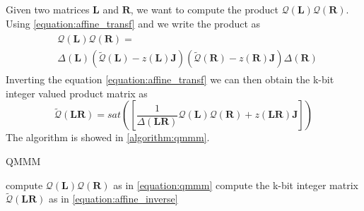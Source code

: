  Given two matrices $\mathbf{L}$ and $\mathbf{R}$, we want to compute the product $\mathcal{Q}(\mathbf{L}) \mathcal{Q}(\mathbf{R})$. Using \cref{equation:affine_transf} and we write the product as 
\begin{align}\label{equation:qmmm}
\begin{split}
& \mathcal{Q}(\mathbf{L}) \mathcal{Q}(\mathbf{R}) =\\
 & \Delta (\mathbf{L})\left( \tilde{\mathcal{Q}}(\mathbf{L}) - z(\mathbf{L})\mathbf{J} \right)
\left( \tilde{\mathcal{Q}}(\mathbf{R}) - z(\mathbf{R})\mathbf{J} \right)  \Delta (\mathbf{R})
\end{split}
\end{align}
Inverting the equation \ref{equation:affine_transf}  we can then obtain the k-bit integer valued product matrix as 
\begin{equation}\label{equation:affine_inverse}
\tilde{\mathcal{Q}}(\mathbf{LR}) = sat([\frac{1}{\Delta(\mathbf{LR})}\mathcal{Q}(\mathbf{L}) \mathcal{Q}(\mathbf{R}) + z(\mathbf{LR}) \mathbf{J}])
\end{equation} The algorithm is showed in \cref{algorithm:qmmm}.

\begin{algorithm}
	\caption{QMMM}\label{algorithm:qmmm}
	\begin{algorithmic}[1]
		\State compute $\mathcal{Q}(\mathbf{L}) \mathcal{Q}(\mathbf{R})$ as in \cref{equation:qmmm}
		\State compute the k-bit integer matrix $\tilde{\mathcal{Q}}(\mathbf{LR})$ as in \cref{equation:affine_inverse}
 	\end{algorithmic}
\end{algorithm}

